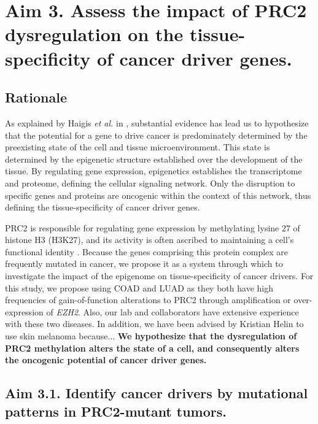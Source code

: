 \section{Aim 3. Assess the impact of PRC2 dysregulation on the tissue-specificity of cancer driver genes.}

\subsection*{Rationale}

As explained by Haigis \emph{et al.} in \cite{Haigis2019}, substantial evidence has lead us to hypothesize that the potential for a gene to drive cancer is predominately determined by the preexisting state of the cell and tissue microenvironment.
This state is determined by the epigenetic structure established over the development of the tissue.
By regulating gene expression, epigenetics establishes the transcriptome and proteome, defining the cellular signaling network.
Only the disruption to specific genes and proteins are oncogenic within the context of this network, thus defining the tissue-specificity of cancer driver genes.

PRC2 is responsible for regulating gene expression by methylating lysine 27 of histone H3 (H3K27), and its activity is often ascribed to maintaining a cell's functional identity \cite{Comet2016MaintainingCancer., Laugesen2019a}.
Because the genes comprising this protein complex are frequently mutated in cancer, we propose it as a system through which to investigate the impact of the epigenome on tissue-specificity of cancer drivers.
For this study, we propose using COAD and LUAD as they both have high frequencies of gain-of-function alterations to PRC2 through amplification or over-expression of \emph{EZH2}.
Also, our lab and collaborators have extensive experience with these two diseases.
In addition, we have been advised by Kristian Helin to use skin melanoma because...
\textbf{We hypothesize that the dysregulation of PRC2 methylation alters the state of a cell, and consequently alters the oncogenic potential of cancer driver genes.}


\subsection*{Aim 3.1. Identify cancer drivers by mutational patterns in PRC2-mutant tumors.}


